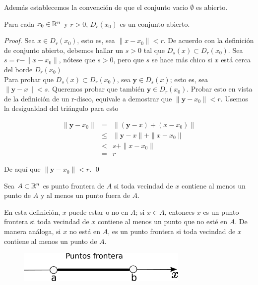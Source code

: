 Además establecemos la convención de que el conjunto vacio $\emptyset$ es abierto.

\begin{theorem}
    Para cada $x_{0} \in \mathbb{R}^{n}$ y $r > 0$, $D_{r}(x_{0})$ es un conjunto abierto.
\end{theorem}

\begin{proof}
    Sea $x \in D_{r}(x_{0})$, esto es, sea $\|x - x_{0}\| < r$. De acuerdo con la definición
    de conjunto abierto, debemos hallar un $s > 0$ tal que $D_{s}(x) \subset  D_{r}(x_{0})$.
    Sea $s = r - \|x - x_{0}\|$, nótese que $s > 0$, pero que $s$ se hace más chico si $x$ está
    cerca del borde $D_{r}(x_{0})$ \\

    Para probar que $D_{s}(x) \subset D_{r}(x_{0})$, sea $\bm{y} \in D_{s}(x)$; esto es, sea
    $\|\bm{y} - x\| < s$. Queremos probar que también $\bm{y} \in D_{r}(x_{0})$. Probar esto en vista
    de la definición de un r-disco, equivale a demostrar que $\|\bm{y} -x_{0}\| < r$. Usemos la desigualdad
    del triángulo para esto

    \begin{eqnarray*}
        \|\bm{y} - x_{0}\| &=& \|(\bm{y} - x) + (x - x_{0})\| \\
                              &\le& \|\bm{y} - x\| + \|x - x_{0}\| \\
                              &<& s + \|x-x_{0}\| \\
                              &=& r
    \end{eqnarray*}

    De aquí que $\|\bm{y} - x_{0}\| < r$. \qed

\end{proof}

\begin{definition}
    Sea $A \subset \mathbb{R}^{n}$ es punto frontera de $A$ si toda vecindad de $x$ contiene al menos un punto de $A$ y al menos un punto fuera de $A$.
\end{definition}

En esta definición, $x$ puede estar o no en $A$; si $x \in A$, entonces $x$ es un punto frontera si toda vecindad de $x$ contiene al menos un punto
que no esté en $A$. De manera análoga, si $x$ no está en $A$, es un punto frontera si toda vecindad de
$x$ contiene al menos un punto de $A$.

\begin{figure}[!ht]
  \begin{center}
      \includegraphics[width=0.5\linewidth]{gfx/puntos-frontera}
      \caption{}
      \label{fig:boat1}
  \end{center}
\end{figure}


